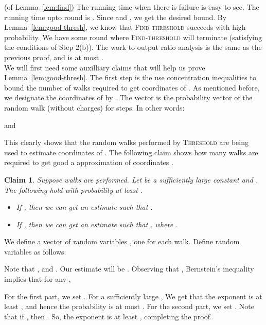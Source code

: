 \documentclass[11pt]{article}
\newtheorem{claim}[theorem]{Claim}
\newenvironment{myproof}{\noindent {\sc Proof:}}{}
\newcommand\Threshold{\textsc{Threshold}\xspace}
\newcommand\Find{\textsc{Find-threshold}\xspace}
\begin{document}
\begin{myproof} (of Lemma~\ref{lem:find}) The running time when there
is failure is easy to see. The running time upto round 
is .
Since  and , we get the desired bound.
By Lemma~\ref{lem:good-thresh}, we know that {\Find} succeeds with high probability.
We have some round  where {\Find} will
terminate (satisfying the conditions of Step 2(b)).
The work to output ratio analysis is the same as the previous
proof, and is at most .
\end{myproof}\\

We will first need some auxilliary claims that
will help us prove Lemma~\ref{lem:good-thresh}.
The first step
is the use concentration inequalities to bound
the number of walks required to get coordinates of .
As mentioned before, we designate the coordinates of  by . The 
vector is the probability vector of the random walk (without charges)
for  steps. In other words:

and

This clearly shows that the random walks performed
by \Threshold{} are being used to estimate coordinates of .
The following claim shows how many  walks are required
to get good a approximation of coordinates .

\begin{claim} \label{clm:est-qi} Suppose  walks are performed. Let
 be a sufficiently large constant and . The following
hold with probability at least .
\begin{itemize}
	\item If , then we can get
	an estimate  such that .
	\item If , then we can get
	an estimate  such that ,
	where .
\end{itemize}
\end{claim}

\begin{myproof} We define a vector of random variables , one
for each walk.
Define random variables  as follows:

Note that , and . Our estimate
 will be .
Observing that , Bernstein's inequality implies that
for any ,

For the first part, we set . For a sufficiently large ,
We get that the exponent is at least , and hence the probability
is at most . For the second part, we set .
Note that if , then .
So, the exponent is at least , completing the proof.
\end{myproof}\\
\end{document}
